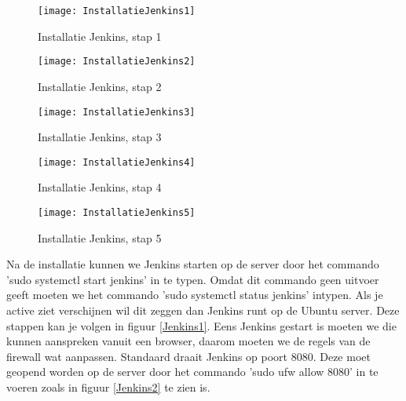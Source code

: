     \begin{figure}	
        \texttt{[image: InstallatieJenkins1]}
        \caption{Installatie Jenkins, stap 1} \label{InstallatieJenkins1}
    \end{figure}
    
    \begin{figure}	
        \texttt{[image: InstallatieJenkins2]}
        \caption{Installatie Jenkins, stap 2} \label{InstallatieJenkins2}
    \end{figure}
    
    \begin{figure}	
        \texttt{[image: InstallatieJenkins3]}
        \caption{Installatie Jenkins, stap 3} \label{InstallatieJenkins3}
    \end{figure}
    
    \begin{figure}	
        \texttt{[image: InstallatieJenkins4]}
        \caption{Installatie Jenkins, stap 4} \label{InstallatieJenkins4}
    \end{figure}
    
    \begin{figure}	
        \texttt{[image: InstallatieJenkins5]}
        \caption{Installatie Jenkins, stap 5} \label{InstallatieJenkins5}
    \end{figure}

    
    Na de installatie kunnen we Jenkins starten op de server door het commando 'sudo systemctl start jenkins' in te typen. Omdat dit commando geen uitvoer geeft moeten we het commando 'sudo systemctl status jenkins' intypen. Als je active ziet verschijnen wil dit zeggen dan Jenkins runt op de Ubuntu server. Deze stappen kan je volgen in figuur \ref{Jenkins1}.
    Eens Jenkins gestart is moeten we die kunnen aanspreken vanuit een browser, daarom moeten we de regels van de firewall wat aanpassen. Standaard draait Jenkins op poort 8080. Deze moet geopend worden op de server door het commando 'sudo ufw allow 8080' in te voeren zoals in figuur \ref{Jenkins2} te zien is.
    
